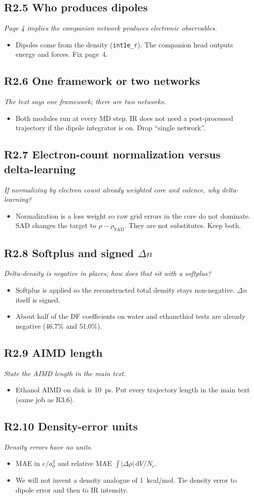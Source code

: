 \documentclass[11pt]{article}
\newcommand{\revpoint}[1]{\textit{#1}\par\nopagebreak\vspace{0.35em}}
\newcommand{\revhead}[1]{\subsection*{#1}}
\begin{document}
\revhead{R2.5 Who produces dipoles}
\revpoint{Page 4 implies the companion network produces electronic observables.}
\begin{itemize}
  \item Dipoles come from the density (\texttt{int1e\_r}). The companion head outputs
        energy and forces. Fix page~4.
\end{itemize}

\revhead{R2.6 One framework or two networks}
\revpoint{The text says one framework; there are two networks.}
\begin{itemize}
  \item Both modules run at every MD step. IR does not need a post-processed trajectory
        if the dipole integrator is on. Drop ``single network''.
\end{itemize}

\revhead{R2.7 Electron-count normalization versus delta-learning}
\revpoint{If normalizing by electron count already weighted core and valence, why delta-learning?}
\begin{itemize}
  \item Normalization is a loss weight so raw grid errors in the core do not dominate.
        SAD changes the target to $\rho-\rho_{\mathrm{SAD}}$. They are not substitutes.
        Keep both.
\end{itemize}

\revhead{R2.8 Softplus and signed $\Delta n$}
\revpoint{Delta-density is negative in places; how does that sit with a softplus?}
\begin{itemize}
  \item Softplus is applied so the reconstructed total density stays non-negative.
        $\Delta n$ itself is signed.
  \item About half of the DF coefficients on water and ethanethiol tests are already
        negative (46.7\% and 51.0\%).
\end{itemize}

\revhead{R2.9 AIMD length}
\revpoint{State the AIMD length in the main text.}
\begin{itemize}
  \item Ethanol AIMD on disk is 10~ps. Put every trajectory length in the main text
        (same job as R3.6).
\end{itemize}

\revhead{R2.10 Density-error units}
\revpoint{Density errors have no units.}
\begin{itemize}
  \item MAE in $e/a_0^3$ and relative MAE $\int|\Delta\rho|\,\mathrm{d}V/N_e$.
  \item We will not invent a density analogue of 1~kcal/mol. Tie density error to
        dipole error and then to IR intensity.
\end{itemize}
\end{document}
